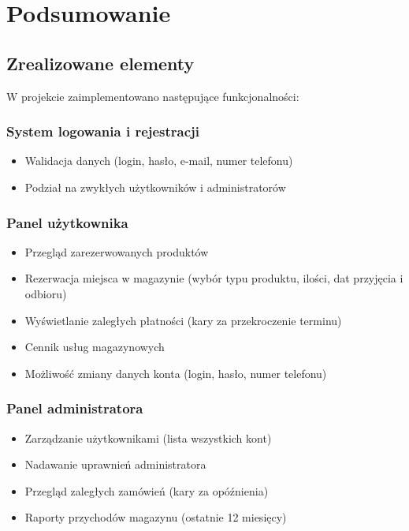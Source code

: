\chapter{Podsumowanie}
\label{chap:Podsumowanie}

\section{Zrealizowane elementy}
\label{sec:Zrealizowane elementy}
W projekcie zaimplementowano następujące funkcjonalności:

\subsection{System logowania i rejestracji}
\label{subsec:System logowania i rejestracji}
\begin{itemize}
\item Walidacja danych (login, hasło, e-mail, numer telefonu)
\item Podział na zwykłych użytkowników i administratorów
\end{itemize}

\subsection{Panel użytkownika}
\label{subsec:Panel użytkownika}
\begin{itemize}
\item Przegląd zarezerwowanych produktów
\item Rezerwacja miejsca w magazynie (wybór typu produktu, ilości, dat przyjęcia i odbioru)
\item Wyświetlanie zaległych płatności (kary za przekroczenie terminu)
\item Cennik usług magazynowych
\item Możliwość zmiany danych konta (login, hasło, numer telefonu)
\end{itemize}

\subsection{Panel administratora}
\label{subsec:Panel administratora}
\begin{itemize}
\item Zarządzanie użytkownikami (lista wszystkich kont)
\item Nadawanie uprawnień administratora
\item Przegląd zaległych zamówień (kary za opóźnienia)
\item Raporty przychodów magazynu (ostatnie 12 miesięcy)
\end{itemize}

